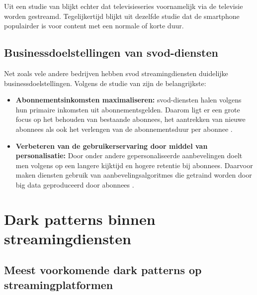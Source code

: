 \vspace{1em}

Uit een studie van \textcite{Climaco2023} blijkt echter dat televisieseries voornamelijk via de televisie worden gestreamd. Tegelijkertijd blijkt uit dezelfde studie dat de smartphone populairder is voor content met een normale of korte duur.

\vspace{1em}

\subsection{Businessdoelstellingen van \acrshort{svod}-diensten}
\label{subsec:businessdoelstellingen}

Net zoals vele andere bedrijven hebben \acrshort{svod} streamingdiensten duidelijke businessdoelstellingen. Volgens de studie van \textcite{Tang2023} zijn de belangrijkste:

\begin{itemize}
    
    \item \textbf{Abonnementsinkomsten maximaliseren:} \acrshort{svod}-diensten halen volgens \textcite{Tang2023} hun primaire inkomsten uit abonnementsgelden. Daarom ligt er een grote focus op het behouden van bestaande abonnees, het aantrekken van nieuwe abonnees als ook het verlengen van de abonnementsduur per abonnee \autocite{Tang2023}.
    
    \item \textbf{Verbeteren van de gebruikerservaring door middel van personalisatie:} Door onder andere gepersonaliseerde aanbevelingen doelt men volgens \textcite{Tang2023} op een langere kijktijd en hogere retentie bij abonnees. Daarvoor maken diensten gebruik van aanbevelingsalgoritmes die getraind worden door big data geproduceerd door abonnees \autocite{Tang2023}.
    
\end{itemize}

\newpage

\section{Dark patterns binnen streamingdiensten}
\label{sec:dark-patterns-streaming}

\subsection{Meest voorkomende dark patterns op streamingplatformen}
\label{subsec:meest-voorkomend}

